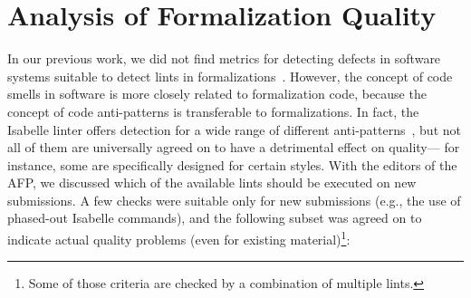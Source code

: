 \section{Analysis of Formalization Quality}\label{sec:quality}
In our previous work,
we did not find metrics for detecting defects in software systems suitable to detect lints in formalizations~\cite{Formal2022Huch}.
However, the concept of code smells in software is more closely related to formalization code,
because the concept of code anti-patterns is transferable to formalizations.
In fact,
the Isabelle linter offers detection for a wide range of different anti-patterns~\cite{Linter2022Megdiche},
but not all of them are universally agreed on to have a detrimental effect on quality---%
for instance, some are specifically designed for certain styles.
With the editors of the AFP, we discussed which of the available lints should be executed on new submissions.
A few checks were suitable only for new submissions (e.g., the use of phased-out Isabelle commands),
and the following subset was agreed on to indicate actual quality problems
(even for existing material)\footnote{
Some of those criteria are checked by a combination of multiple lints.}:
